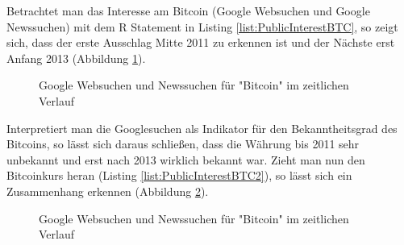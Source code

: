 Betrachtet man das Interesse am Bitcoin (Google Websuchen und Google Newssuchen) mit dem R Statement in Listing \ref{list:PublicInterestBTC}, so zeigt sich, dass der erste Ausschlag Mitte 2011 zu erkennen ist und der Nächste erst Anfang 2013 (Abbildung \ref{fig:PublicInterestBTC}). 

\begin{figure}[H]
\caption{Google Websuchen und Newssuchen für "Bitcoin" im zeitlichen Verlauf}
\label{fig:PublicInterestBTC}
\centering
\end{figure}
Interpretiert man die Googlesuchen als Indikator für den Bekanntheitsgrad des Bitcoins, so lässt sich daraus schließen, dass die Währung bis 2011 sehr unbekannt und erst nach 2013 wirklich bekannt war. Zieht man nun den Bitcoinkurs heran (Listing \ref{list:PublicInterestBTC2}), so lässt sich ein Zusammenhang erkennen (Abbildung \ref{fig:PublicInterestBTC2}). 

\begin{figure}[H]
\caption{Google Websuchen und Newssuchen für "Bitcoin" im zeitlichen Verlauf}
\label{fig:PublicInterestBTC2}
\centering
\end{figure}

